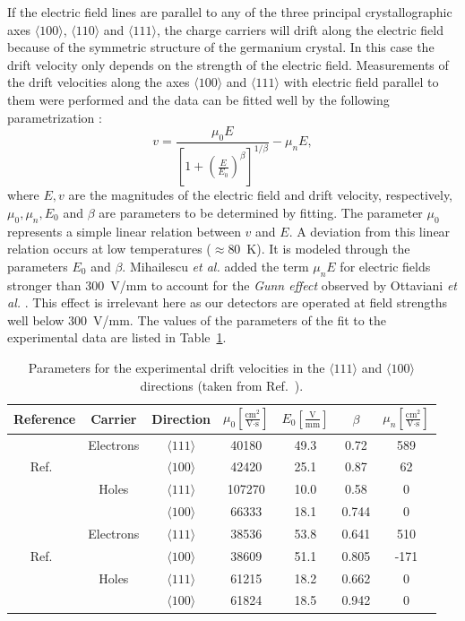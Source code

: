 If the electric field lines are parallel to any of the three principal crystallographic axes $\langle 100 \rangle$, $\langle 110 \rangle$ and $\langle 111 \rangle$, the charge carriers will drift along the electric field because of the symmetric structure of the germanium crystal. In this case the drift velocity only depends on the strength of the electric field. Measurements of the drift velocities along the axes $\langle 100 \rangle$ and $\langle 111 \rangle$ with electric field parallel to them were performed and the data can be fitted well by the following parametrization \cite{Kno99}:
\begin{equation}
\label{eq:pss:para}
v = \frac{\mu_{0}E}{[1+(\frac{E}{E_{0}})^{\beta}]^{1/\beta}} - \mu_{n}E,
\end{equation}
where $E, v$ are the magnitudes of the electric field and drift velocity, respectively, $\mu_{0}, \mu_{n}, E_{0}$ and $\beta$ are parameters to be determined by fitting. The parameter $\mu_{0}$ represents a simple linear relation between $v$ and $E$. A deviation from this linear relation occurs at low temperatures ($\approx$80~K). It is modeled through the parameters $E_{0}$ and $\beta$. Mihailescu \textit{et al.} \cite{miha} added the term $\mu_{n}E$ for electric fields stronger than 300~V/mm to account for the \emph{Gunn effect} observed by Ottaviani \textit{et al.} \cite{otta}. This effect is irrelevant here as our detectors are operated at field strengths well below 300~V/mm. The values of the parameters of the fit to the experimental data are listed in Table~\ref{tab:pss:pars}. 

\begin{table}[tbhp]
\centering
\caption{Parameters for the experimental drift velocities in the $\langle111\rangle$ and $\langle 100 \rangle$ directions (taken from Ref.~\cite{bart}).}
\label{tab:pss:pars}
\begin{tabular*}{\textwidth}{ccccccc}\hline\hline
Reference & Carrier & Direction & $\mu_{0} \left[ \frac{\mbox{cm}^{2}}{\mbox{V}\cdot\mbox{s}} \right]$ & $E_{0} \left[ \frac{\mbox{V}}{\mbox{mm}} \right]$ & $\beta$ & $\mu_{n} \left[ \frac{\mbox{cm}^{2}}{\mbox{V}\cdot\mbox{s}} \right]$ \\\hline
& Electrons & $\langle111\rangle$ & 40180 & 49.3 & 0.72 & 589 \\
Ref.~\cite{miha}& & $\langle100\rangle$ & 42420 & 25.1 & 0.87 & 62\\
& Holes & $\langle111\rangle$ & 107270 & 10.0 & 0.58 & 0 \\
& & $\langle100\rangle$ & 66333 & 18.1 & 0.744 & 0 \\\hline
& Electrons & $\langle111\rangle$ & 38536 & 53.8 & 0.641 & 510 \\
Ref.~\cite{bart}& & $\langle100\rangle$ & 38609 & 51.1 & 0.805 & -171\\ 
& Holes & $\langle111\rangle$ & 61215 & 18.2 & 0.662 & 0 \\
& & $\langle100\rangle$ & 61824 & 18.5 & 0.942 & 0 \\\hline\hline
\end{tabular*}
\end{table}

